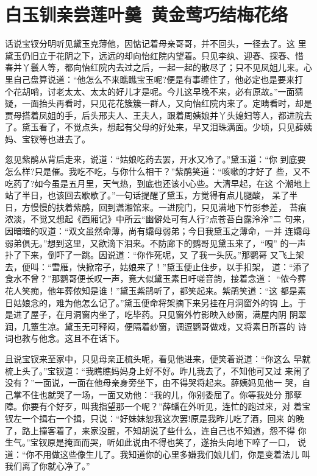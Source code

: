 \chapter{白玉钏亲尝莲叶羹~黄金莺巧结梅花络}

话说宝钗分明听见黛玉克薄他，因惦记着母亲哥哥，并不回头，一径去了。这
里黛玉仍旧立于花阴之下，远远的却向怡红院内望着。只见李纨、迎春、探春、惜
春并丫鬟人等，都向怡红院内去过之后，一起一起的散尽了；只不见凤姐儿来。心
里自己盘算说道：“他怎么不来瞧瞧宝玉呢?便是有事缠住了，他必定也是要来打
个花胡哨，讨老太太、太太的好儿才是呢。今儿这早晚不来，必有原故。”一面猜
疑，一面抬头再看时，只见花花簇簇一群人，又向怡红院内来了。定睛看时，却是
贾母搭着凤姐的手，后头邢夫人、王夫人，跟着周姨娘并丫头媳妇等人，都进院去
了。黛玉看了，不觉点头，想起有父母的好处来，早又泪珠满面。少顷，只见薛姨
妈、宝钗等也进去了。

忽见紫鹃从背后走来，说道：“姑娘吃药去罢，开水又冷了。”黛玉道：“你
到底要怎么样?只是催。我吃不吃，与你什么相干？”紫鹃笑道：“咳嗽的才好了
些，又不吃药了?如今虽是五月里，天气热，到底也还该小心些。大清早起，在这
个潮地上站了半日，也该回去歇歇了。”一句话提醒了黛玉，方觉得有点儿腿酸，
呆了半日，方慢慢的扶着紫鹃，回到潇湘馆来。一进院门，只见满地下竹影参差，
苔痕浓淡，不觉又想起《西厢记》中所云“幽僻处可有人行?点苍苔白露泠泠”二
句来，因暗暗的叹道：“双文虽然命薄，尚有孀母弱弟；今日我黛玉之薄命，一并
连孀母弱弟俱无。”想到这里，又欲滴下泪来。不防廊下的鹦哥见黛玉来了，“嘎”
的一声扑了下来，倒吓了一跳。因说道：“你作死呢，又了我一头灰。”那鹦哥
又飞上架去，便叫：“雪雁，快掀帘子，姑娘来了！”黛玉便止住步，以手扣架，
道：“添了食水不曾？”那鹦哥便长叹一声，竟大似黛玉素日吁嗟音韵，接着念道：
“侬今葬花人笑痴，他年葬侬知是谁！”黛玉紫鹃听了，都笑起来。紫鹃笑道：“这
都是素日姑娘念的，难为他怎么记了。”黛玉便命将架摘下来另挂在月洞窗外的钩
上。于是进了屋子，在月洞窗内坐了，吃毕药。只见窗外竹影映入纱窗，满屋内阴
阴翠润，几簟生凉。黛玉无可释闷，便隔着纱窗，调逗鹦哥做戏，又将素日所喜的
诗词也教与他念。这且不在话下。

且说宝钗来至家中，只见母亲正梳头呢，看见他进来，便笑着说道：“你这么
早就梳上头了。”宝钗道：“我瞧瞧妈妈身上好不好。昨儿我去了，不知他可又过
来闹了没有？”一面说，一面在他母亲身旁坐下，由不得哭将起来。薛姨妈见他一
哭，自己掌不住也就哭了一场，一面又劝他：“我的儿，你别委屈了。你等我处分
那孽障。你要有个好歹，叫我指望那一个呢？”薛蟠在外听见，连忙的跑过来，对
着宝钗左一个揖右一个揖，只说：“好妹妹恕我这次罢!原是我昨儿吃了酒，回来
的晚了，路上撞客着了，来家没醒，不知胡说了些什么，连自己也不知道，怨不得
你生气。”宝钗原是掩面而哭，听如此说由不得也笑了，遂抬头向地下啐了一口，
说道：“你不用做这些像生儿了。我知道你的心里多嫌我们娘儿们，你是变着法儿
叫我们离了你就心净了。”

